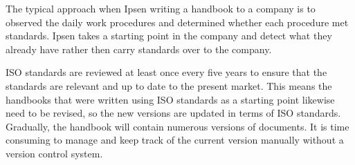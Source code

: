 The typical approach when Ipsen writing a handbook to a company is to observed the daily work procedures and determined whether each procedure met standards. Ipsen takes a starting point in the company and detect what they already have rather then carry standards over to the company.


ISO standards are reviewed at least once every five years to ensure that the standards are relevant and up to date to the present market\cite{ISOreviewedevery5years}. This means the handbooks that were written using ISO standards as a starting point likewise need to be revised, so the new versions are updated in terms of ISO standards. Gradually, the handbook will contain numerous versions of documents. It is time consuming to manage and keep track of the current version manually without a version control system.